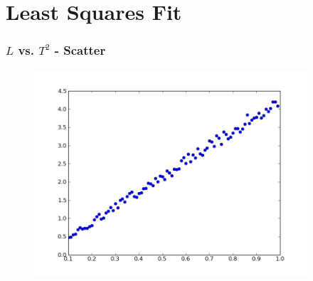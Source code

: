 \documentclass[14pt,compress]{beamer}
\newcounter{time}
\newcommand{\inctime}[1]{\addtocounter{time}{#1}{\tiny \thetime\ m}}
\begin{document}


\section{Least Squares Fit}
\begin{frame}[fragile]
\frametitle{$L$ vs. $T^2$ - Scatter}
\vspace{-0.15in}
\begin{figure}
\includegraphics[width=4in]{data/L-Tsq-points}
\end{figure}
\end{frame}
\end{document}
